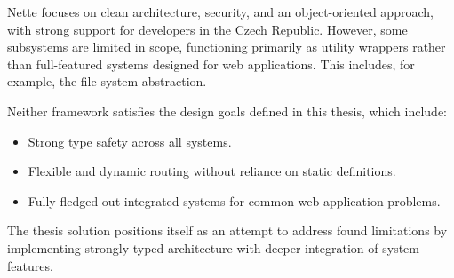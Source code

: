 Nette focuses on clean architecture, security, and an object-oriented approach,
with strong support for developers in the Czech Republic.
However, some subsystems are limited in scope,
functioning primarily as utility wrappers rather than full-featured systems designed for web applications.
This includes, for example, the file system abstraction.

Neither framework satisfies the design goals defined in this thesis, which include:

\begin{itemize}
    \item Strong type safety across all systems.
    \item Flexible and dynamic routing without reliance on static definitions.
    \item Fully fledged out integrated systems for common web application problems.
\end{itemize}

The thesis solution positions itself as an attempt to address found limitations by implementing strongly typed architecture
with deeper integration of system features.
